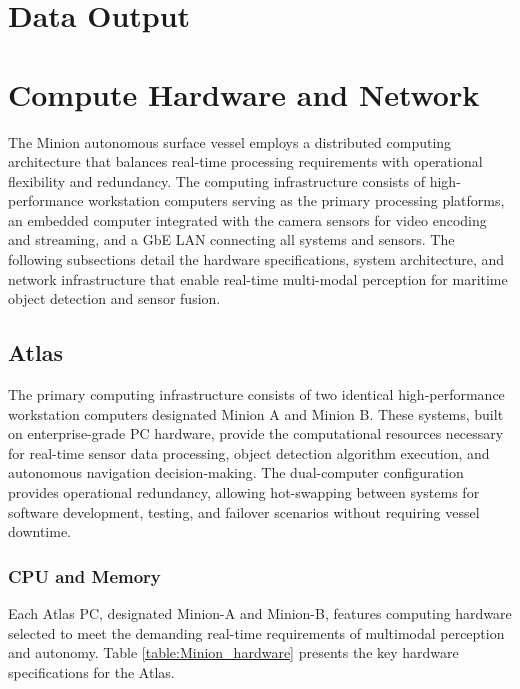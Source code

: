     \section{Data Output}


\section{Compute Hardware and Network} \label{sec:Atlas_LAN}

The Minion autonomous surface vessel employs a distributed computing architecture that balances real-time processing requirements with operational flexibility and redundancy. 
The computing infrastructure consists of high-performance workstation computers serving as the primary processing platforms, an embedded computer integrated with the camera sensors for video encoding and streaming, and a \ac{GbE} \ac{LAN} connecting all systems and sensors. 
The following subsections detail the hardware specifications, system architecture, and network infrastructure that enable real-time multi-modal perception for maritime object detection and sensor fusion.

\subsection{Atlas} \label{atlas}

The primary computing infrastructure consists of two identical high-performance workstation computers designated Minion A and Minion B.
These systems, built on enterprise-grade PC hardware, provide the computational resources necessary for real-time sensor data processing, object detection algorithm execution, and autonomous navigation decision-making.
The dual-computer configuration provides operational redundancy, allowing hot-swapping between systems for software development, testing, and failover scenarios without requiring vessel downtime.

\subsubsection{CPU and Memory}
Each Atlas PC, designated Minion-A and Minion-B, features computing hardware selected to meet the demanding real-time requirements of multimodal perception and autonomy.
Table \ref{table:Minion_hardware} presents the key hardware specifications for the Atlas.%

